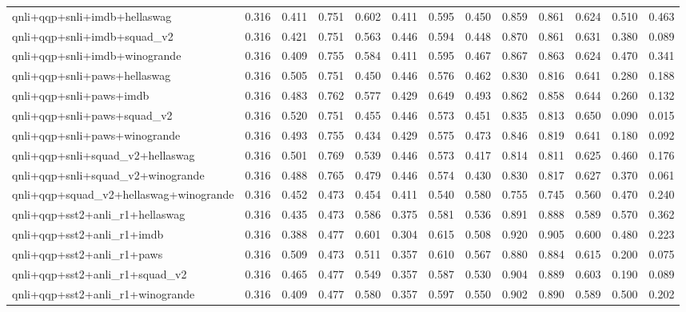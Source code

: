 \begin{table}[t]
\begin{tabular}{lrrrrrrrrrrrr}
    qnli+qqp+snli+imdb+hellaswag & 0.316 & 0.411 & 0.751 & 0.602 & 0.411 & 0.595 & 0.450 & 0.859 & 0.861 & 0.624 & 0.510 & 0.463 \\
    qnli+qqp+snli+imdb+squad\_v2 & 0.316 & 0.421 & 0.751 & 0.563 & 0.446 & 0.594 & 0.448 & 0.870 & 0.861 & 0.631 & 0.380 & 0.089 \\
    qnli+qqp+snli+imdb+winogrande & 0.316 & 0.409 & 0.755 & 0.584 & 0.411 & 0.595 & 0.467 & 0.867 & 0.863 & 0.624 & 0.470 & 0.341 \\
    qnli+qqp+snli+paws+hellaswag & 0.316 & 0.505 & 0.751 & 0.450 & 0.446 & 0.576 & 0.462 & 0.830 & 0.816 & 0.641 & 0.280 & 0.188 \\
    qnli+qqp+snli+paws+imdb & 0.316 & 0.483 & 0.762 & 0.577 & 0.429 & 0.649 & 0.493 & 0.862 & 0.858 & 0.644 & 0.260 & 0.132 \\
    qnli+qqp+snli+paws+squad\_v2 & 0.316 & 0.520 & 0.751 & 0.455 & 0.446 & 0.573 & 0.451 & 0.835 & 0.813 & 0.650 & 0.090 & 0.015 \\
    qnli+qqp+snli+paws+winogrande & 0.316 & 0.493 & 0.755 & 0.434 & 0.429 & 0.575 & 0.473 & 0.846 & 0.819 & 0.641 & 0.180 & 0.092 \\
    qnli+qqp+snli+squad\_v2+hellaswag & 0.316 & 0.501 & 0.769 & 0.539 & 0.446 & 0.573 & 0.417 & 0.814 & 0.811 & 0.625 & 0.460 & 0.176 \\
    qnli+qqp+snli+squad\_v2+winogrande & 0.316 & 0.488 & 0.765 & 0.479 & 0.446 & 0.574 & 0.430 & 0.830 & 0.817 & 0.627 & 0.370 & 0.061 \\
    qnli+qqp+squad\_v2+hellaswag+winogrande & 0.316 & 0.452 & 0.473 & 0.454 & 0.411 & 0.540 & 0.580 & 0.755 & 0.745 & 0.560 & 0.470 & 0.240 \\
    qnli+qqp+sst2+anli\_r1+hellaswag & 0.316 & 0.435 & 0.473 & 0.586 & 0.375 & 0.581 & 0.536 & 0.891 & 0.888 & 0.589 & 0.570 & 0.362 \\
    qnli+qqp+sst2+anli\_r1+imdb & 0.316 & 0.388 & 0.477 & 0.601 & 0.304 & 0.615 & 0.508 & 0.920 & 0.905 & 0.600 & 0.480 & 0.223 \\
    qnli+qqp+sst2+anli\_r1+paws & 0.316 & 0.509 & 0.473 & 0.511 & 0.357 & 0.610 & 0.567 & 0.880 & 0.884 & 0.615 & 0.200 & 0.075 \\
    qnli+qqp+sst2+anli\_r1+squad\_v2 & 0.316 & 0.465 & 0.477 & 0.549 & 0.357 & 0.587 & 0.530 & 0.904 & 0.889 & 0.603 & 0.190 & 0.089 \\
    qnli+qqp+sst2+anli\_r1+winogrande & 0.316 & 0.409 & 0.477 & 0.580 & 0.357 & 0.597 & 0.550 & 0.902 & 0.890 & 0.589 & 0.500 & 0.202 \\

\end{tabular}
\end{table}
